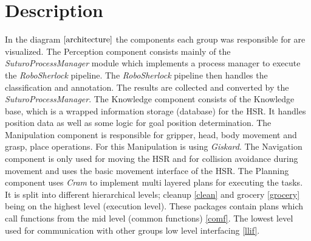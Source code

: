 \documentclass[main.tex]{subfiles}
\begin{document}
		\section{Description}
			In the diagram \(\ref{architecture}\) the components each group was responsible for are visualized. The Perception component consists mainly of the \textit{SuturoProcessManager} module which implements a process manager to execute the \textit{RoboSherlock} pipeline. The \textit{RoboSherlock} pipeline then handles the classification and annotation. The results are collected and converted by the \textit{SuturoProcessManager}.  The Knowledge component consists of the Knowledge base, which is a wrapped information storage (database) for the HSR. It handles position data as well as some logic for goal position determination. The Manipulation component is responsible for gripper, head, body movement and grasp, place operations. For this Manipulation is using \textit{Giskard}. The Navigation component is only used for moving the HSR and for collision avoidance during movement and uses the basic movement interface of the HSR. The Planning component uses \textit{Cram} to implement multi layered plans for executing the tasks. It is split into different hierarchical levels; cleanup \ref{clean} and grocery \ref{grocery} being on the highest level (execution level). These packages contain plans which call functions from the mid level (common functions) \ref{comf}. The lowest level used for communication with other groups low level interfacing \ref{llif}.
\end{document}
